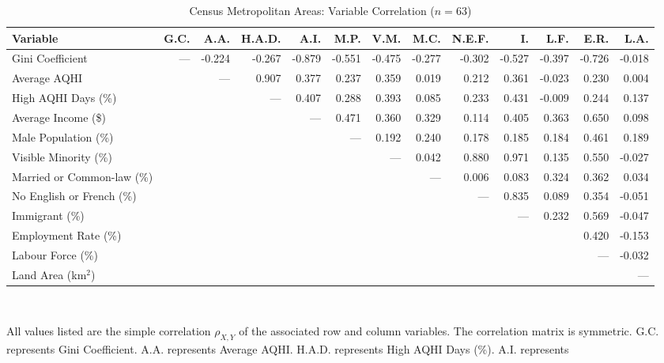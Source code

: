 \documentclass[AEJ]{AEA}
\begin{document}
\begin{table}[htbp]\centering
\caption{Census Metropolitan Areas: Variable Correlation ($n = 63$)}
\label{tab:corr}
\begin{adjustbox}{max width=\textwidth}
\begin{tabular}{lrrrrrrrrrrrr}
\toprule
\textbf{Variable} & \textbf{G.C.} & \textbf{A.A.} & \textbf{H.A.D.} & 
\textbf{A.I.} & \textbf{M.P.} & \textbf{V.M.} &
\textbf{M.C.} & \textbf{N.E.F.} & \textbf{I.} &
\textbf{L.F.} & \textbf{E.R.} &
\textbf{L.A.}\\
\midrule
Gini Coefficient & --- & -0.224 & -0.267 & -0.879 & -0.551 & -0.475 & -0.277 & -0.302 & -0.527 
& -0.397 & -0.726 & -0.018 \\
Average AQHI &  & --- &  0.907 & 0.377 & 0.237 & 0.359 & 0.019 & 0.212 & 0.361 & -0.023 & 0.230
& 0.004 \\
High AQHI Days (\%) &  &  & --- & 0.407 & 0.288 & 0.393 & 0.085 & 0.233 & 0.431 & -0.009 & 0.244
& 0.137 \\
Average Income (\$) &  &  &  & --- & 0.471 & 0.360 & 0.329 & 0.114 & 0.405 & 0.363 & 0.650
& 0.098 \\
Male Population (\%) &  &  &  &  &  --- & 0.192 & 0.240 & 0.178 & 0.185 & 0.184 & 0.461
& 0.189 \\
Visible Minority (\%) &  &  &  &  &  & --- & 0.042 & 0.880 & 0.971 & 0.135 & 0.550
& -0.027 \\
Married or Common-law (\%) &  &  &  &  &  &  & --- & 0.006 & 0.083 & 0.324 & 0.362
& 0.034 \\
No English or French (\%) &  &  &  &  &  & &  & --- & 0.835 & 0.089 & 0.354
& -0.051 \\
Immigrant (\%) &  &  &  &  &   &  &  &  & --- & 0.232 & 0.569 & -0.047 \\
Employment Rate (\%) &  &  &  &  &  &  &  &  &  &  & 0.420 & -0.153 \\
Labour Force (\%) &  &  &  &  &  &  &  &  &  &  & --- & -0.032 \\
Land Area (km$^2$) &  &  &  &  &  &  &  &  &  &  &  & --- \\
\bottomrule
\end{tabular}
\end{adjustbox}
\\[1ex]
\begin{tablenotes}
All values listed are the simple correlation $\rho_{X,Y}$ of the associated row and 
column variables. The correlation matrix is symmetric. G.C. represents Gini Coefficient.
A.A. represents Average AQHI. H.A.D. represents High AQHI Days (\%). A.I. represents

\end{tablenotes}
\end{table}
\end{document}
